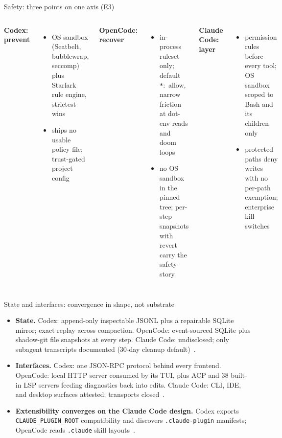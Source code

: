 \documentclass[aspectratio=169,11pt]{beamer}
\newcommand{\codex}[0]{Codex}
\newcommand{\occ}[0]{OpenCode}
\newcommand{\ccc}[0]{Claude Code}
\begin{document}
\begin{frame}{Safety: three points on one axis (E3)}
  \footnotesize
  \begin{columns}[T]
      \textbf{\codex{}: prevent}
      \begin{itemize}
        \item OS sandbox (Seatbelt, bubblewrap, seccomp) plus Starlark
          rule engine, strictest-wins~\citep{codexRepo,codexSandboxingDocs}
        \item ships no usable policy file; trust-gated project config
      \end{itemize}
      \textbf{\occ{}: recover}
      \begin{itemize}
        \item in-process ruleset only; default \texttt{*}:~allow, narrow
          friction at dot-env reads and doom loops~\citep{opencodeRepo}
        \item no OS sandbox in the pinned tree; per-step snapshots with
          revert carry the safety story
      \end{itemize}
      \textbf{\ccc{}: layer}
      \begin{itemize}
        \item permission rules before every tool; OS sandbox scoped to
          Bash and its children only~\citep{claudeCodePermissionsDocs,claudeCodeSandboxingDocs}
        \item protected paths deny writes with no per-path exemption;
          enterprise kill switches
      \end{itemize}
  \end{columns}
\end{frame}

\begin{frame}{State and interfaces: convergence in shape, not substrate}
  \begin{itemize}
    \item \textbf{State.} \codex{}: append-only inspectable JSONL plus a
      repairable SQLite mirror; exact replay across compaction. \occ{}:
      event-sourced SQLite plus shadow-git file snapshots at every step.
      \ccc{}: undisclosed; only subagent transcripts documented (30-day
      cleanup default)~\citep{codexRepo,opencodeRepo,claudeCodeSubagentsDocs}.
    \item \textbf{Interfaces.} \codex{}: one JSON-RPC protocol behind
      every frontend. \occ{}: local HTTP server consumed by its TUI,
      plus ACP and 38 built-in LSP servers feeding diagnostics back into
      edits. \ccc{}: CLI, IDE, and desktop surfaces attested; transports
      closed~\citep{codexRepo,opencodeRepo,claudeCodePermissionsDocs}.
    \item \textbf{Extensibility converges on the \ccc{} design.}
      \codex{} exports \texttt{CLAUDE\_PLUGIN\_ROOT} compatibility and
      discovers \texttt{.claude-plugin} manifests; \occ{} reads
      \texttt{.claude} skill layouts~\citep{codexRepo,opencodeRepo}.
  \end{itemize}
\end{frame}
\end{document}
